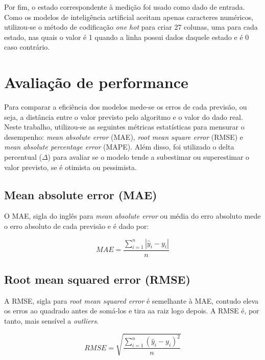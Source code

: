 Por fim, o estado correspondente à medição foi usado como dado de entrada. 
Como os modelos de inteligência artificial aceitam apenas caracteres numéricos,
utilizou-se o método de codificação \textit{one hot} para criar 27 colunas, uma
para cada estado, nas quais o valor é 1 quando a linha possui dados daquele estado 
e é 0 caso contrário.


    \section{Avaliação de performance}

    Para comparar a eficiência dos modelos mede-se os erros de 
    cada previsão, ou seja, a distância entre o valor previsto 
    pelo algoritmo e o valor do dado real. Neste trabalho, 
    utilizou-se as seguintes métricas estatísticas para 
    mensurar o desempenho: \textit{mean absolute error} (MAE),
    \textit{root mean square  error} (RMSE) e \textit{mean 
    absolute percentage error} (MAPE). Além disso, foi utilizado
    o delta percentual ($\Delta$) para avaliar se o modelo tende 
    a subestimar ou superestimar o valor previsto, se é otimista
    ou pessimista.

\subsection{Mean absolute error (MAE)}

    O MAE, sigla do inglês para \textit{mean absolute error}
    ou média do erro absoluto mede o erro absoluto de cada previsão
    e é dado por:\cite{forecast-evaluation-ds}

    \begin{equation}
        MAE = \frac{\sum_{i=1}^n |\hat{y}_i - y_i|}{n}
    \end{equation}

\subsection{Root mean squared error (RMSE)}

    A RMSE, sigla para \textit{root mean squared  error} é
    semelhante à MAE, contudo eleva os erros ao quadrado antes de 
    somá-los e tira aa raiz logo depois. A RMSE é, por tanto, 
    mais sensível a \textit{outliers}.\cite{forecast-evaluation-ds}

    \begin{equation}
        RMSE = \sqrt{\frac{\sum_{i=1}^n (\hat{y}_i - y_i)^2}{n}}
    \end{equation}

